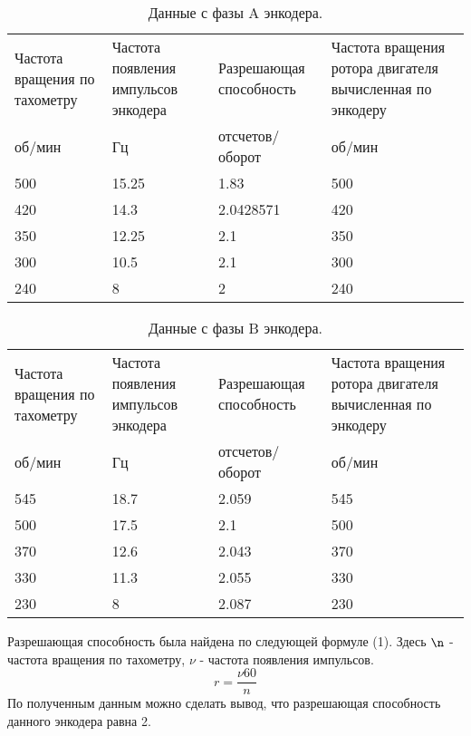 \documentclass[a4paper, 11pt]{article}
\begin{document}
\begin{table} [h!]
	\centering
	\begin{tabular} {|p{3cm}|p{4cm}|p{3cm}|p{5cm}|}
		\hline
		Частота вращения по тахометру & Частота появления импульсов энкодера & Разрешающая способность & Частота вращения ротора двигателя вычисленная по энкодеру \\
		об/мин & Гц & отсчетов/оборот & об/мин \\ \hline
		500 & 15.25 & 1.83 & 500 \\
		420 & 14.3 & 2.0428571 & 420 \\
		350 & 12.25 & 2.1 & 350 \\
		300 & 10.5 & 2.1 & 300 \\
		240 & 8 & 2 & 240 \\ \hline
	\end{tabular}
	\caption{Данные с фазы A энкодера.}
\end{table}

\begin{table} [h!]
	\begin{tabular} {|p{3cm}|p{4cm}|p{3cm}|p{5cm}|}
		\hline
		Частота вращения по тахометру & Частота появления импульсов энкодера & Разрешающая способность & Частота вращения ротора двигателя вычисленная по энкодеру \\
		об/мин & Гц & отсчетов/оборот & об/мин \\ \hline
		545 & 18.7 & 2.059 & 545 \\
		500 & 17.5 & 2.1 & 500 \\ 
		370 & 12.6 & 2.043 & 370 \\
		330 & 11.3 & 2.055 & 330 \\
		230 & 8 & 2.087 & 230 \\ \hline
	\end{tabular}
	\caption{Данные с фазы B энкодера.}
\end{table}

Разрешающая способность была найдена по следующей формуле (1). Здесь $\n$ - частота вращения по тахометру, $\nu$ - частота появления импульсов.
\begin{equation}
	r = \frac{\nu60}{n}
\end{equation}
По полученным данным можно сделать вывод, что разрешающая способность данного энкодера равна 2.
\newpage
\end{document}
